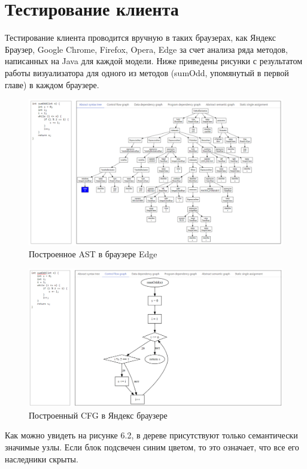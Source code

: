 \section{Тестирование клиента} \label{ch6:sec2}
Тестирование клиента проводится вручную в таких браузерах, как Яндекс Браузер, Google Chrome, Firefox, Opera, Edge за счет анализа ряда методов, написанных на Java для каждой модели. Ниже приведены рисунки с результатом работы визуализатора для одного из методов (sumOdd, упомянутый в первой главе) в каждом браузере.

\begin{figure}[h]
	\center
	\includegraphics [scale=0.5] {my_folder/images/my/21}
	\caption{Построенное AST в браузере Edge}
	\label{fig:21}
\end{figure}

\begin{figure}[h]
	\center
	\includegraphics [scale=0.6] {my_folder/images/my/22}
	\caption{Построенный CFG в Яндекс браузере}
	\label{fig:22}
\end{figure}

Как можно увидеть на рисунке 6.2, в дереве присутствуют только семантически значимые узлы. Если блок подсвечен синим цветом, то это означает, что все его наследники скрыты.

